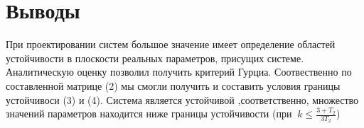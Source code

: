 \documentclass[a4paper, 11pt]{article}
\begin{document}
\newpage
\section*{Выводы}
При проектировании систем большое значение имеет определение областей устойчивости в плоскости реальных параметров, присущих системе. Аналитическую оценку позволил получить критерий Гурциа. Соотвественно по составленной матрице (2) мы смогли получить и составить условия границы устойчивоси (3) и (4). Система является устойчивой ,соответственно, множество значений параметров находится ниже границы устойчивости (при %
$\ k \le \frac{{3 + {T_2}}}{{3{T_2}}}$)
\end{document}
